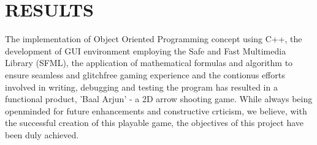 \section{RESULTS}
The implementation of Object Oriented Programming concept using C++, the development of GUI environment employing the Safe and Fast Multimedia Library (SFML), the application of mathematical formulas and algorithm to ensure seamless and glitchfree gaming experience and the contionus efforts involved in writing, debugging and testing the program has resulted in a functional product, 'Baal Arjun' - a 2D arrow shooting game. While always being openminded for future enhancements and constructive crticism, we believe, with the successful creation of this playable game, the objectives of this project have been duly achieved.

\newpage